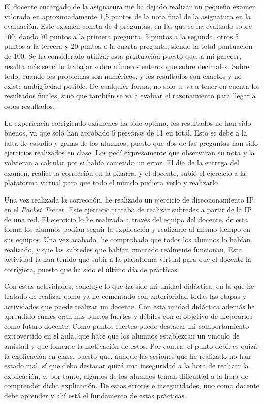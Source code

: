 \documentclass[spanish,12pt, a4paper,twoside]{paper}
\begin{document}
El docente encargado de la asignatura me ha dejado realizar un pequeño examen valorado en aproximadamente 1,5 puntos de la nota final de la asignatura en la evaluación. Este examen consta de 4 preguntas, en las que se ha evaluado sobre 100, dando 70 puntos a la primera pregunta, 5 puntos a la segunda, otros 5 puntos a la tercera y 20 puntos a la cuarta pregunta, siendo la total puntuación de 100. Se ha considerado utilizar esta puntuación puesto que, a mi parecer, resulta más sencillo trabajar sobre números enteros que sobre decimales. Sobre todo, cuando los problemas son numéricos, y los resultados son exactos y no existe ambigüedad posible. De cualquier forma, no solo se va a tener en cuenta los resultados finales, sino que también se va a evaluar el razonamiento para llegar a estos resultados. 

La experiencia corrigiendo exámenes ha sido optima, los resultados no han sido buenos, ya que solo han aprobado 5 personas de 11 en total. Esto se debe a la falta de estudio y ganas de los alumnos, puesto que dos de las preguntas han sido ejercicios realizados en clase. Los pedí expresamente que observaran su nota y la volvieran a calcular por si había cometido un error. El día de la entrega del examen, realice la corrección en la pizarra, y el docente, subió el ejercicio a la plataforma virtual para que todo el mundo pudiera verlo y realizarlo.

Una vez realizada la corrección, he realizado un ejercicio de direccionamiento IP en el \textit{Packet Tracer}. Este ejercicio trataba de realizar subredes a partir de la IP de una red. El ejercicio lo he realizado a través del equipo del docente, de esta forma los alumnos podían seguir la explicación y realizarlo al mismo tiempo en sus equipos. Una vez acabado, he comprobado que todos los alumnos lo habían realizado, y que las subredes que habían montado realmente funcionan. Esta actividad la han tenido que subir a la plataforma virtual para que el docente la corrigiera, puesto que ha sido el último día de prácticas.

Con estas actividades, concluye lo que ha sido mi unidad didáctica, en la que he tratado de realizar como ya he comentado con anterioridad todas las etapas y actividades que puede realizar un docente. Con esta unidad didáctica además he aprendido cuales eran mis puntos fuertes y débiles con el objetivo de mejorarlos como futuro docente. Como puntos fuertes puedo destacar mi comportamiento extrovertido en el aula, que hace que los alumnos establezcan un vínculo de amistad y que fomente la motivación de estos. Por contra, el punto débil es quizá la explicación en clase, puesto que, aunque las sesiones que he realizado no han estado mal, sí que debo destacar quizá una inseguridad a la hora de realizar la explicación, y, por tanto, algunos de los alumnos tenían dificultad a la hora de comprender dicha explicación. De estos errores e inseguridades, uno como docente debe aprender y ahí está el fundamento de estas prácticas.
\end{document}
